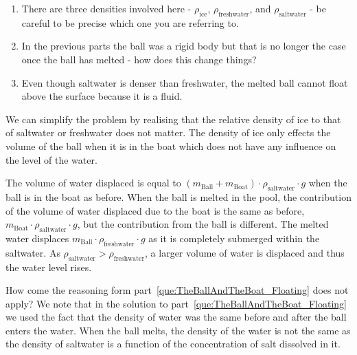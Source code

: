 \begin{parts}
	\begin{hints}
		\begin{enumerate}
			\item There are three densities involved here - $\rho_\text{ice}$, $\rho_\text{freshwater}$, and $\rho_\text{saltwater}$ - be careful to be precise which one you are referring to.
			\item In the previous parts the ball was a rigid body but that is no longer the case once the ball has melted - how does this change things?
			\item Even though saltwater is denser than freshwater, the melted ball cannot float above the surface because it is a fluid.
		\end{enumerate}
	\end{hints}
	
	\begin{solution}
	
		We can simplify the problem by realising that the relative density of ice to that of saltwater or freshwater does not matter. The density of ice only effects the volume of the ball when it is in the boat which does not have any influence on the level of the water.
		
		The volume of water displaced is equal to $(m_\text{Ball} + m_\text{Boat})\cdot \rho_\text{saltwater} \cdot g$ when the ball is in the boat as before. When the ball is melted in the pool, the contribution of the volume of water displaced due to the boat is the same as before, $m_\text{Boat} \cdot \rho_\text{saltwater} \cdot g$, but the contribution from the ball is different. The melted water displaces $m_\text{Ball} \cdot \rho_\text{freshwater} \cdot g$ as it is completely submerged within the saltwater. As $\rho_\text{saltwater} > \rho_\text{freshwater}$, a larger volume of water is displaced and thus the water level rises.
		
		How come the reasoning form part~\ref{que:TheBallAndTheBoat_Floating} does not apply? We note that in the solution to part~\ref{que:TheBallAndTheBoat_Floating} we used the fact that the density of water was the same before and after the ball enters the water. When the ball melts, the density of the water is not the same as the density of saltwater is a function of the concentration of salt dissolved in it.
	
	\end{solution}

\end{parts}
